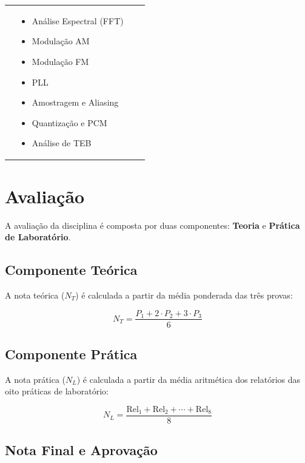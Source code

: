 \documentclass[11pt,a4paper]{article}
\begin{document}
\begin{center}
\begin{tabular}{|p{}|p{}|p{}|p{}|}
{\begin{itemize}[noitemsep, leftmargin=*, nosep, font=\small]
  \end{itemize}
  \vspace{0.2em}
} &
\parbox[t]{0.20\textwidth}{%
  \vspace{0.2em}
  \begin{itemize}[noitemsep, leftmargin=*, nosep, font=\small]
    \item Análise Espectral (FFT)
    \item Modulação AM
    \item Modulação FM
    \item PLL
    \item Amostragem e Aliasing
    \item Quantização e PCM
    \item Análise de TEB
  \end{itemize}
  \vspace{0.2em}
} \\
\hline
\end{tabular}
\end{center}

\section{Avaliação}

A avaliação da disciplina é composta por duas componentes: \textbf{Teoria} e \textbf{Prática de Laboratório}.

\subsection*{Componente Teórica}

A nota teórica ($N_T$) é calculada a partir da média ponderada das três provas:

\[
N_T = \frac{P_1 + 2 \cdot P_2 + 3 \cdot P_3}{6}
\]

\subsection*{Componente Prática}

A nota prática ($N_L$) é calculada a partir da média aritmética dos relatórios das oito práticas de laboratório:

\[
N_L = \frac{\text{Rel}_1 + \text{Rel}_2 + \cdots + \text{Rel}_8}{8}
\]

\subsection*{Nota Final e Aprovação}
\end{document}
